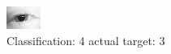\begin{figure}[h!]
\begin{center}
\includegraphics[width=0.60\columnwidth]{figures/ID13_class_4_target_3.png}
\end{center}
\caption{ Classification: 4 actual target: 3}
\label{fig:ID13_class_4_target_3}
\end{figure}
